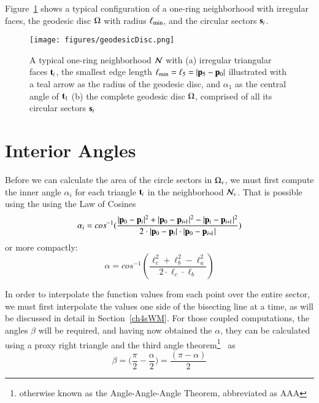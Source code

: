 Figure~\ref{fig:geodesicDisc} shows a typical configuration of a one-ring neighborhood with irregular faces, the geodesic disc $\Omega$ with radius $\ell_\text{min}$, and the circular sectors $\mathbf{s}_i$.

\begin{figure}[ht]
\ffigbox
	{\texttt{[image: figures/geodesicDisc.png]}}
	{\caption[One-ring and geodesic disc]{A typical one-ring neighborhood $\mathcal{N}$ with (a) irregular triangular faces $\mathbf{t}_i$, the smallest edge length $\ell_\text{min} = \ell_5 = |\mathbf{p}_5 - \mathbf{p}_0|$ illustrated with a teal arrow as the radius of the geodesic disc, and $\alpha_1$ as the central angle of $\mathbf{t}_1$ (b) the complete geodesic disc $\Omega$, comprised of all its circular sectors $\mathbf{s}_i$}\label{fig:geodesicDisc}}
\end{figure}%

%
%
%
%
\section{Interior Angles}
\label{ch4sIA}
Before we can calculate the area of the circle sectors in $\Omega_v$, we must first compute the inner angle $\alpha_i$ for each triangle $\mathbf{t}_i$ in the neighborhood $\mathcal{N}_v$. That is possible using the using the Law of Cosines~\cite{Weisstein19e}
%
\begin{equation}
	\alpha_i = cos^{-1}(\frac{|\bp_0 - \bp_{i}|^2 + |\bp_0 - \bp_{\sipo}|^2 - |\bp_i - \bp_{\sipo}|^2}{2\cdot|\bp_0 - \bp_{i}|\cdot|\bp_0 - \bp_{\sipo}|})
\end{equation}
%
or more compactly:
%
\begin{equation}
	\alpha = cos^{-1}\left (\frac{\ell_c^2 + \ell_b^2 - \ell_a^2}{2\cdot\ell_c\cdot\ell_b}\right )
	\label{eq:alphaFromEdgeLengths}
\end{equation}%
%

In order to interpolate the function values from each point over the entire sector, we must first interpolate the values one side of the bisecting line at a time, as will be discussed in detail in Section~\ref{ch4sWM}. For those coupled computations, the angles $\beta$ will be required, and having now obtained the $\alpha$, they can be calculated using a proxy right triangle and the third angle theorem\footnote{otherwise known as the Angle-Angle-Angle Theorem, abbreviated as AAA}~\cite{Weisstein19f} as
%
\begin{equation}
	\beta = \Big(\frac{\pi}{2} - \frac{\alpha}{2}\Big) = \frac{(\pi - \alpha)}{2}
	\label{eq:betaFromHalfAlpha}
\end{equation}%
%

